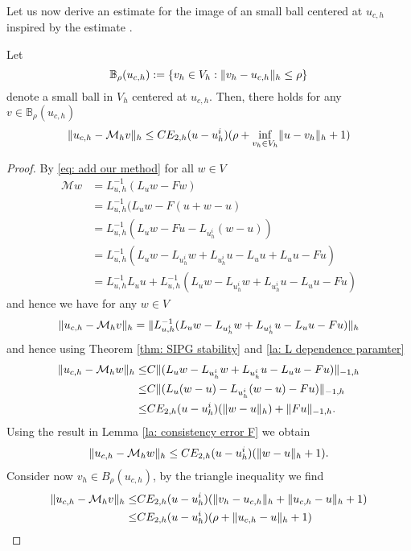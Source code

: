 Let us now derive an estimate for the image of an small ball centered at $u_{c,h}$ inspired by the estimate \cite[Lemma 3.6]{BGN+2011}.
\begin{lemma} \label{la: mapping property of M}
	Let 
	\[
		\mathbb B_\rho(u_{c,h}):=\{v_h \in V_h: \lVert v_h - u_{c,h} \rVert_{h} \leq \rho\}
	\]
	denote a small ball in $V_h$ centered at $u_{c,h}$. 
	Then, there holds for any $v \in \mathbb B_\rho(u_{c,h})$
	\[
		\lVert u_{c,h} - \mathcal M_h v \rVert_{h} \leq C E_{2,h}(u - u^i_h) (\rho+ \inf_{v_h \in V_h} \lVert u-v_h \rVert_{h}+1)
	\] 
\end{lemma}
\begin{proof}
By \eqref{eq: add our method} for all $w \in V$
\begin{align}
	\mathcal M w &= L_{u,h}^{-1}(L_u w - Fw) \nonumber\\
				 &= L_{u,h}^{-1}(L_u w - F(u+w-u) \nonumber\\
				 &= L_{u,h}^{-1}(L_u w - Fu - L_{u^i_h} (w-u)) \nonumber\\
				 &=  L_{u,h}^{-1}(L_u w - L_{u^i_h} w + L_{u^i_h}u - L_u u + L_u u - Fu) \nonumber\\
				 & = L_{u,h}^{-1} L_u u + L_{u,h}^{-1}(L_u w - L_{u^i_h} w + L_{u^i_h}u - L_u u - Fu) \label{eq: expand M}
 \end{align}	
 and hence we have for any $w \in V$
	\begin{align}
		\lVert u_{c,h} - \mathcal M_h v \rVert_{h} = \lVert L_{u,h}^{-1}(L_u w - L_{u^i_h} w + L_{u^i_h}u - L_u u - Fu) \rVert_{h}
	\end{align}
	and hence using Theorem \ref{thm: SIPG stability} and \ref{la: L dependence paramter}
	\begin{align*}
		\lVert u_{c,h} - \mathcal M_h w \rVert_{h} 
		\leq& C\lVert (L_u w - L_{u^i_h} w + L_{u^i_h} u- L_u u - Fu) \rVert_{-1,h} \nonumber\\
		\leq& C\lVert (L_u (w-u) - L_{u^i_h} (w-u) - Fu) \rVert_{-1,h} \nonumber\\
				\leq& C E_{2,h}(u - u^i_h) (\lVert w-u \rVert_{h}) +\lVert Fu \rVert_{-1,h}.
	\end{align*}
	Using the result in Lemma \ref{la: consistency error F} we obtain
	\begin{align*}
		\lVert u_{c,h} - \mathcal M_h w \rVert_{h} \leq C E_{2,h}(u - u^i_h) (\lVert w-u \rVert_{h}+1).
	\end{align*}
	Consider now $v_h \in B_\rho(u_{c,h})$, by the triangle inequality we find 
	\begin{align}
		\lVert u_{c,h} - \mathcal M_h v \rVert_{h} 
			\leq& C E_{2,h}(u - u^i_h) (\lVert v_h-u_{c,h} \rVert_{h}+ \lVert u_{c,h}-u \rVert_{h} +1) \nonumber \\
			\leq& C E_{2,h}(u - u^i_h) (\rho+ \lVert u_{c,h}-u \rVert_{h} +1)			
	\end{align}
\end{proof}

